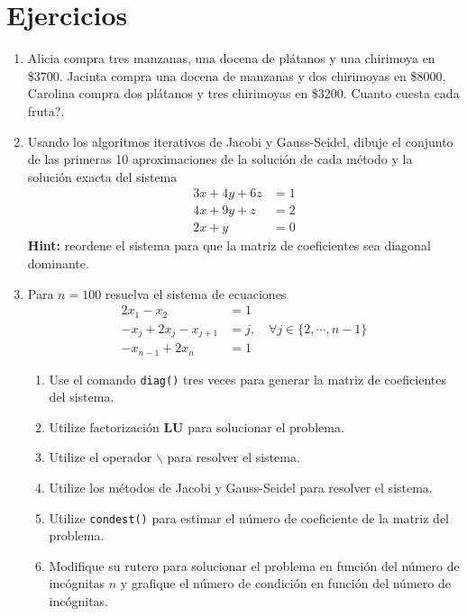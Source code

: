 \documentclass[letter,11pt]{article}
\begin{document}
\section{Ejercicios}
\begin{enumerate}
\item Alicia compra tres manzanas, una docena de pl\'atanos y una chirimoya en \$3700. Jacinta compra una docena de manzanas y dos chirimoyas en \$8000, Carolina compra dos pl\'atanos y tres chirimoyas en \$3200. \textquestiondown Cuanto cuesta cada fruta?.

\item Usando los algoritmos iterativos de Jacobi y Gauss-Seidel, dibuje el conjunto de las primeras 10 aproximaciones de la soluci\'on de cada m\'etodo y la soluci\'on exacta del sistema
$$
\begin{array}{cl}
3x+4y+6z	& = 1\\
4x+9y+z	& = 2\\
2x+y		& = 0
\end{array}
$$
\textbf{Hint:} reordene el sistema para que la matriz de coeficientes sea diagonal dominante.

\item Para $n=100$ resuelva el sistema de ecuaciones
$$
\begin{array}{ll}
2x_1-x_2			&	=1\\
-x_j+2x_j-x_{j+1}	& 	=j , \quad \forall j\in\{2,\cdots,n-1\}\\
-x_{n-1}+2x_n		&	=1
\end{array}
$$
\begin{enumerate}
\item Use el comando \texttt{diag()} tres veces para generar la matriz de coeficientes del sistema.
\item Utilize factorizaci\'on \textbf{LU} para solucionar el problema.
\item Utilize el operador $\backslash$ para resolver el sistema.
\item Utilize los m\'etodos de Jacobi y Gauss-Seidel para resolver el sistema.
\item Utilize \texttt{condest()} para estimar el n\'umero de coeficiente de la matriz del problema.
\item Modifique su rutero para solucionar el problema en funci\'on del n\'umero de inc\'ognitas $n$ y grafique el n\'umero de condici\'on en funci\'on del n\'umero de inc\'ognitas.
\end{enumerate}



\end{enumerate}
\end{document}
